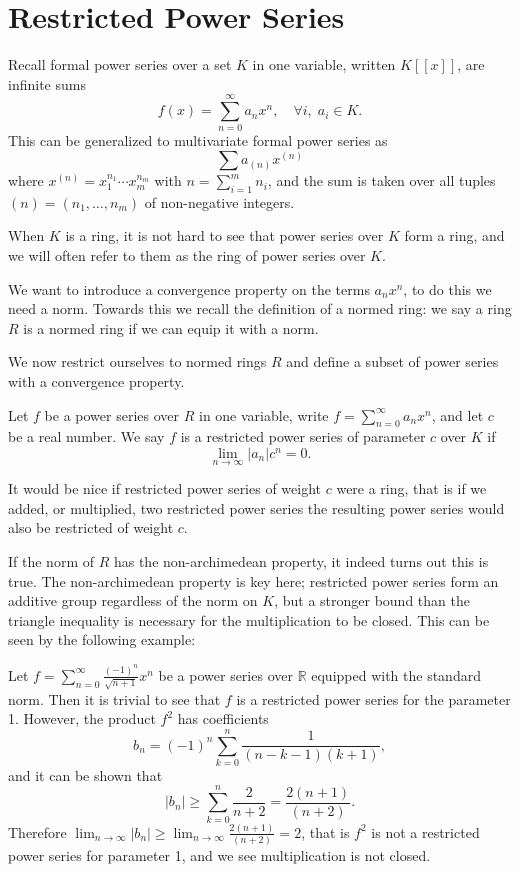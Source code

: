 \chapter{Restricted Power Series}

Recall formal power series over a set $K$ in one variable, written $K [ \! [ x ] \! ] $, are
infinite sums
\[
f(x) = \sum_{n=0}^\infty a_n x^n, \quad \forall i, \; a_i \in K.
\]
This can be generalized to multivariate formal power series as
\[
\sum a_{(n)} x^{(n)}
\]
where $x^{(n)} = x_1^{n_1} \cdots x_m^{n_m}$ with $n = \sum_{i = 1}^m n_i$, and the sum is taken
over all tuples $(n) = (n_1,\dots,n_m)$ of non-negative integers.

When $K$ is a ring, it is not hard to see that power series over $K$ form a ring, and we will often
refer to them as the ring of power series over $K$.

We want to introduce a convergence property on the terms $a_n x^n$, to do this we need a norm.
Towards this we recall the definition of a normed ring: we say a ring $R$ is a normed ring if we can
equip it with a norm.


We now restrict ourselves to normed rings $R$ and define a subset of power series with a convergence
property.

\begin{definition}
    \label{PowerSeries.IsRestricted}
    \leanok
    Let $f$ be a power series over $R$ in one variable, write $f = \sum_{n=0}^\infty a_n x^n$, and
    let $c$ be a real number. We say $f$ is a restricted power series of parameter $c$ over $K$ if
    \[
    \lim_{n \to \infty} \lvert a_n \rvert c^n = 0.
    \]
\end{definition}

It would be nice if restricted power series of weight $c$ were a ring, that is if we added, or
multiplied, two restricted power series the resulting power series would also be restricted of
weight $c$.

If the norm of $R$ has the non-archimedean property, it indeed turns out this is true.
The non-archimedean property is key here; restricted power series form an additive group regardless
of the norm on $K$, but a stronger bound than the triangle inequality is necessary for the
multiplication to be closed. This can be seen by the following example:

Let $f = \sum_{n=0}^\infty \frac{(-1)^n}{\sqrt{n+1}}x^n$ be a power series over $\mathbb{R}$
equipped with the standard norm. Then it is trivial to see that $f$ is a restricted power series for
the parameter 1. However, the product $f^2$ has coefficients
\[
b_n = (-1)^n \sum_{k=0}^n \frac{1}{(n - k -1)(k+1)},
\]
and it can be shown that
\[
\lvert b_n\rvert \geq \sum_{k = 0}^n \frac{2}{n + 2} = \frac{2 (n + 1)}{(n + 2)}.
\]
Therefore $\lim_{n \to \infty} \lvert b_n \rvert \geq \lim_{n \to \infty} \frac{2(n+1)}{(n+2)}=2$,
that is $f^2$ is not a restricted power series for parameter 1, and we see multiplication is not
closed.

